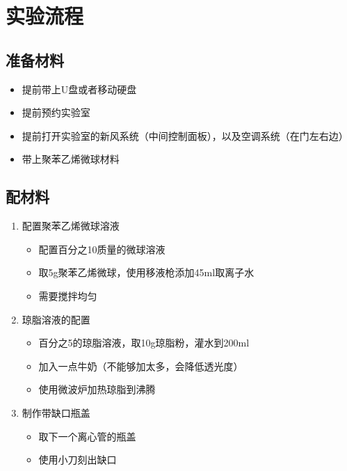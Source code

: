 \documentclass[12pt]{article}
\begin{document}
\section{实验流程}

\subsection{准备材料}
\begin{itemize}
    \item 提前带上U盘或者移动硬盘
    \item 提前预约实验室
    \item 提前打开实验室的新风系统（中间控制面板），以及空调系统（在门左右边）
    \item 带上聚苯乙烯微球材料
\end{itemize}
\subsection{配材料}
\begin{enumerate}

    \item 配置聚苯乙烯微球溶液
    \begin{itemize}
        \item 配置百分之10质量的微球溶液
        \item 取5g聚苯乙烯微球，使用移液枪添加45ml取离子水
        \item 需要搅拌均匀
    \end{itemize}

    \item 琼脂溶液的配置
    \begin{itemize}
        \item 百分之5的琼脂溶液，取10g琼脂粉，灌水到200ml
        \item 加入一点牛奶（不能够加太多，会降低透光度）
        \item 使用微波炉加热琼脂到沸腾
    \end{itemize}

    \item 制作带缺口瓶盖
    \begin{itemize}
        \item 取下一个离心管的瓶盖
        \item 使用小刀刻出缺口
    \end{itemize}

\end{enumerate}
\end{document}
